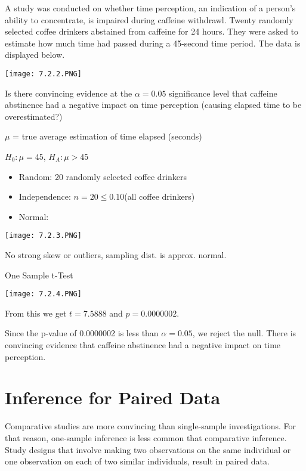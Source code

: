 \documentclass[../stats.tex]{subfiles}
\begin{document}
\begin{example}
    A study was conducted on whether time perception, an indication of a person's ability to concentrate, is impaired during caffeine withdrawl. Twenty randomly selected coffee drinkers abstained from caffeine for 24 hours.
    They were asked to estimate how much time had passed during a 45-second time period. The data is displayed below.
    \begin{center}
        \texttt{[image: 7.2.2.PNG]}
    \end{center}
    Is there convincing evidence at the $\alpha=0.05$ significance level that caffeine abstinence had a negative impact on time perception (causing elapsed time to be overestimated?)

    $\mu$ = true average estimation of time elapsed (seconds)

    $H_0: \mu=45$, $H_A: \mu>45$

    \begin{itemize}
        \item Random: 20 randomly selected coffee drinkers 
        \item Independence: $n=20\leq 0.10$(all coffee drinkers)
        \item Normal:
    \end{itemize}
    \begin{center}
        \texttt{[image: 7.2.3.PNG]}
    \end{center}
    No strong skew or outliers, sampling dist. is approx. normal.

    One Sample t-Test 

    \begin{center}
        \texttt{[image: 7.2.4.PNG]}
    \end{center}
    From this we get $t=7.5888$ and $p=0.0000002$.

    Since the p-value of 0.0000002 is less than $\alpha=0.05$, we reject the null. There is convincing evidence that caffeine abstinence had a negative impact on time perception.
\end{example}


\section{Inference for Paired Data}
Comparative studies are more convincing than single-sample investigations. For that reason, one-sample inference is less common that comparative inference. Study designs that involve making two observations 
on the same individual or one observation on each of two similar individuals, result in paired data.
\end{document}
